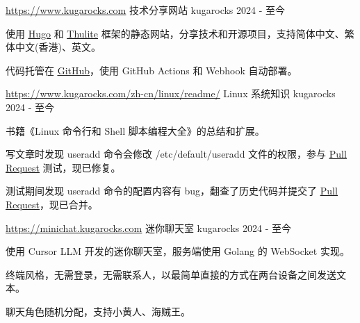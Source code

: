 

\begin{cventries}

  \cventry
    {\href{https://www.kugarocks.com}{\uline{https://www.kugarocks.com}}} %
    {技术分享网站} %
    {kugarocks} %
    {2024 - 至今} %
    {
      \begin{cvitems} %
        \item {使用 \href{https://gohugo.io/}{\uline{Hugo}} 和 \href{https://thulite.io/}{\uline{Thulite}} 框架的静态网站，分享技术和开源项目，支持简体中文、繁体中文(香港)、英文。}
        \item {代码托管在 \href{https://github.com/kugarocks/kugarocks.github.io}{\uline{GitHub}}，使用 GitHub Actions 和 Webhook 自动部署。}
      \end{cvitems}
    }

  \cventry
    {\href{https://www.kugarocks.com/zh-cn/linux/readme/}{\uline{https://www.kugarocks.com/zh-cn/linux/readme/}}} %
    {Linux 系统知识} %
    {kugarocks} %
    {2024 - 至今} %
    {
      \begin{cvitems} %
        \item {书籍《Linux 命令行和 Shell 脚本编程大全》的总结和扩展。}
        \item {写文章时发现 useradd 命令会修改 /etc/default/useradd 文件的权限，参与 \href{https://github.com/shadow-maint/shadow/pull/1083}{\uline{Pull Request}} 测试，现已修复。}
        \item {测试期间发现 useradd 命令的配置内容有 bug，翻查了历史代码并提交了 \href{https://github.com/shadow-maint/shadow/pull/1086}{\uline{Pull Request}}，现已合并。}
      \end{cvitems}
    }

  \cventry
    {\href{https://minichat.kugarocks.com}{\uline{https://minichat.kugarocks.com}}} %
    {迷你聊天室} %
    {kugarocks} %
    {2024 - 至今} %
    {
      \begin{cvitems} %
        \item {使用 Cursor LLM 开发的迷你聊天室，服务端使用 Golang 的 WebSocket 实现。}
        \item {终端风格，无需登录，无需联系人，以最简单直接的方式在两台设备之间发送文本。}
        \item {聊天角色随机分配，支持小黄人、海贼王。}
      \end{cvitems}
    }


\end{cventries}

